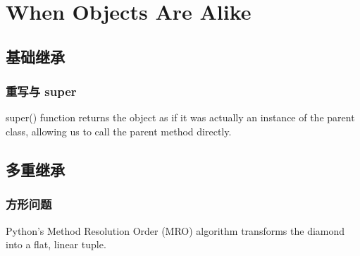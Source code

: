 \chapter{When Objects Are Alike\label{ch03}}
\section{基础继承}
\subsection{重写与 super}
super() function returns the object as if it was actually an instance of the parent class, allowing us to call the parent method directly.
\section{多重继承}
\subsection{方形问题}
Python's Method Resolution Order (MRO) algorithm transforms the diamond into a flat, linear tuple.